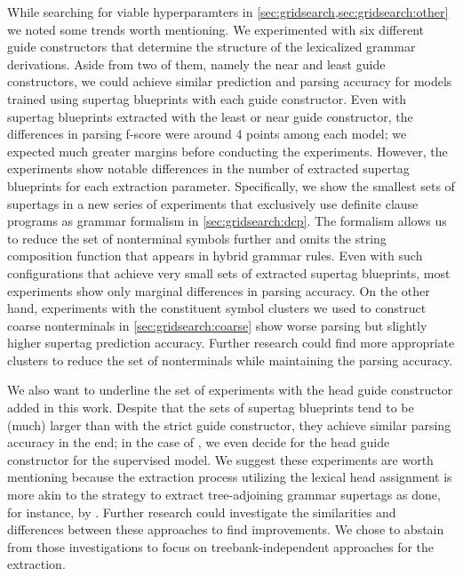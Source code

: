 \documentclass[../document.tex]{subfiles}
\begin{document}
    While searching for viable hyperparamters in \cref{sec:gridsearch,sec:gridsearch:other} we noted some trends worth mentioning.
    We experimented with six different guide constructors that determine the structure of the lexicalized grammar derivations. Aside from two of them, namely the near and least guide constructors, we could achieve similar prediction and parsing accuracy for models trained using supertag blueprints with each guide constructor.
    Even with supertag blueprints extracted with the least or near guide constructor, the differences in parsing f-score were around 4 points among each model; we expected much greater margins before conducting the experiments.
    However, the experiments show notable differences in the number of extracted supertag blueprints for each extraction parameter.
    Specifically, we show the smallest sets of supertags in a new series of experiments that exclusively use definite clause programs as grammar formalism in \cref{sec:gridsearch:dcp}.
    The formalism allows us to reduce the set of nonterminal symbols further and omits the string composition function that appears in hybrid grammar rules.
    Even with such configurations that achieve very small sets of extracted supertag blueprints, most experiments show only marginal differences in parsing accuracy.
    On the other hand, experiments with the constituent symbol clusters we used to construct coarse nonterminals in \cref{sec:gridsearch:coarse} show worse parsing but slightly higher supertag prediction accuracy.
    Further research could find more appropriate clusters to reduce the set of nonterminals while maintaining the parsing accuracy.

    We also want to underline the set of experiments with the head guide constructor added in this work.
    Despite that the sets of supertag blueprints tend to be (much) larger than with the strict guide constructor, they achieve similar parsing accuracy in the end; in the case of , we even decide for the head guide constructor for the supervised model.
    We suggest these experiments are worth mentioning because the extraction process utilizing the lexical head assignment is more akin to the strategy to extract tree-adjoining grammar supertags as done, for instance, by \citet{Kaeshammer2012GermanAE, Bla18}.
    Further research could investigate the similarities and differences between these approaches to find improvements.
    We chose to abstain from those investigations to focus on treebank-independent approaches for the extraction.
\end{document}
